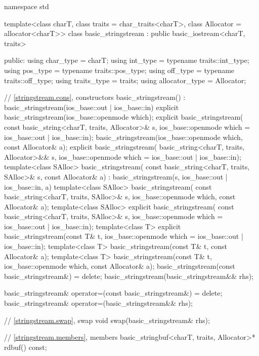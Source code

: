 %
\begin{codeblock}
namespace std {
  template<class charT, class traits = char_traits<charT>,
           class Allocator = allocator<charT>>
  class basic_stringstream : public basic_iostream<charT, traits> {
  public:
    using char_type      = charT;
    using int_type       = typename traits::int_type;
    using pos_type       = typename traits::pos_type;
    using off_type       = typename traits::off_type;
    using traits_type    = traits;
    using allocator_type = Allocator;

    // \ref{stringstream.cons}, constructors
    basic_stringstream() : basic_stringstream(ios_base::out | ios_base::in) {}
    explicit basic_stringstream(ios_base::openmode which);
    explicit basic_stringstream(
      const basic_string<charT, traits, Allocator>& s,
      ios_base::openmode which = ios_base::out | ios_base::in);
    basic_stringstream(ios_base::openmode which, const Allocator& a);
    explicit basic_stringstream(
      basic_string<charT, traits, Allocator>&& s,
      ios_base::openmode which = ios_base::out | ios_base::in);
    template<class SAlloc>
      basic_stringstream(
        const basic_string<charT, traits, SAlloc>& s, const Allocator& a)
        : basic_stringstream(s, ios_base::out | ios_base::in, a) {}
    template<class SAlloc>
      basic_stringstream(
        const basic_string<charT, traits, SAlloc>& s,
        ios_base::openmode which, const Allocator& a);
    template<class SAlloc>
      explicit basic_stringstream(
        const basic_string<charT, traits, SAlloc>& s,
        ios_base::openmode which = ios_base::out | ios_base::in);
    template<class T>
      explicit basic_stringstream(const T& t,
                                  ios_base::openmode which = ios_base::out | ios_base::in);
    template<class T>
      basic_stringstream(const T& t, const Allocator& a);
    template<class T>
      basic_stringstream(const T& t, ios_base::openmode which, const Allocator& a);
    basic_stringstream(const basic_stringstream&) = delete;
    basic_stringstream(basic_stringstream&& rhs);

    basic_stringstream& operator=(const basic_stringstream&) = delete;
    basic_stringstream& operator=(basic_stringstream&& rhs);

    // \ref{stringstream.swap}, swap
    void swap(basic_stringstream& rhs);

    // \ref{stringstream.members}, members
    basic_stringbuf<charT, traits, Allocator>* rdbuf() const;

}}
\end{codeblock}
